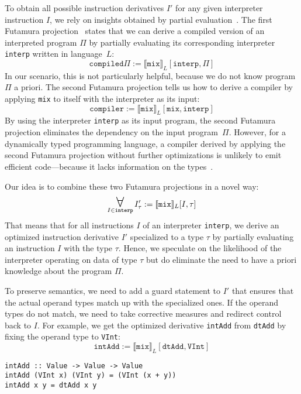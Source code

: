 \documentclass[preprint,10pt]{popl14conf}
\begin{document}
To obtain all possible instruction derivatives $I'$ for any given interpreter instruction $I$, we
rely on insights obtained by partial evaluation~\cite{jones.etal+93}.
The first Futamura projection~\cite{futamura+71} states that we can derive a compiled version of an
interpreted program $\Pi$ by partially evaluating its corresponding interpreter \texttt{interp}
written in language~$L$:
\begin{equation}
  \label{eq:first-futamura}
  \mathtt{compiled}\Pi := \llbracket \mathtt{mix} \rrbracket_{L} [ \mathtt{interp}, \Pi ]
\end{equation}
In our scenario, this is not particularly helpful, because we do not know program $\Pi$ a priori.
The second Futamura projection tells us how to derive a compiler by applying \texttt{mix} to itself
with the interpreter as its input:
\begin{equation}
  \label{eq:second-futamura}
  \mathtt{compiler} := \llbracket \mathtt{mix} \rrbracket_{L} [ \mathtt{mix}, \mathtt{interp} ]
\end{equation}
By using the interpreter \texttt{interp} as its input program, the second Futamura projection
eliminates the dependency on the input program~$\Pi$.
However, for a dynamically typed programming language, a compiler derived by applying the second
Futamura projection without further optimizations is unlikely to emit efficient code---because it
lacks information on the types~\cite{thibault.etal+00}.

Our idea is to combine these two Futamura projections in a novel way:
\begin{equation}
  \label{eq:deriving-instrs}
  \displaystyle\mathop{\mathlarger{\mathlarger{\mathlarger{\forall}}}}_{I \in \mathtt{interp}}
  I_{\tau}' := \llbracket \mathtt{mix} \rrbracket_{L} [ I, \tau ]
\end{equation}
That means that for all instructions $I$ of an interpreter \texttt{interp}, we derive an optimized
instruction derivative $I'$ specialized to a type $\tau$ by partially evaluating an instruction $I$
with the type $\tau$.
Hence, we speculate on the likelihood of the interpreter operating on data of type $\tau$ but do
eliminate the need to have a priori knowledge about the program $\Pi$.


To preserve semantics, we need to add a guard statement to $I'$ that ensures that the actual operand
types match up with the specialized ones.
If the operand types do not match, we need to take corrective measures and redirect control back to
$I$.
For example, we get the optimized derivative \texttt{intAdd} from \texttt{dtAdd} by fixing the
operand type to \texttt{VInt}:
\begin{equation}
  \label{eq:deriving-instrs}
  \mathtt{intAdd} := \llbracket \mathtt{mix} \rrbracket_{L} [ \mathtt{dtAdd}, \mathtt{VInt} ]
\end{equation}
\begin{lstlisting}[style=prettyhaskell]
intAdd :: Value -> Value -> Value
intAdd (VInt x) (VInt y) = (VInt (x + y))
intAdd x y = dtAdd x y
\end{lstlisting}
\end{document}
